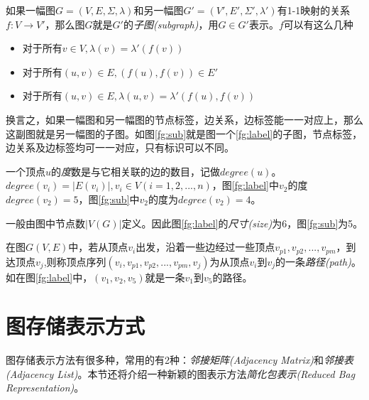 \documentclass{XDBAthesis}
\begin{document}
\begin{minipage}{\textwidth}
    \begin{minipage}{0.4\textwidth}
        \centering
        
        \label{fg:label}
    \end{minipage}%
    \begin{minipage}{0.6\textwidth}
        \centering
        
        \label{fg:sub}
    \end{minipage}\hfill
\end{minipage}
\begin{defn}[子图]
    如果一幅图$G=(V,E,\Sigma,\lambda)$和另一幅图$G'=(V',E',\Sigma',\lambda')$有1-1映射的关系$f:V\rightarrow V'$，那么图$G$就是$G'$的\emph{子图(subgraph)}，用$G\in G' $表示。$f$可以有这么几种
\begin{itemize}
    \item 对于所有$v\in V,\lambda(v)=\lambda '(f(v))$
    \item 对于所有$(u,v)\in E,(f(u),f(v))\in E'$
    \item 对于所有$(u,v)\in E,\lambda(u,v)=\lambda '(f(u),f(v)) $
\end{itemize}
\end{defn}
换言之，如果一幅图和另一幅图的节点标签，边关系，边标签能一一对应上，那么这副图就是另一幅图的子图。如图\ref{fg:sub}就是图一个\ref{fg:label}的子图，节点标签，边关系及边标签均可一一对应，只有标识可以不同。
\begin{defn}
    一个顶点$u$的\emph{度}数是与它相关联的边的数目，记做$degree(u)$。$degree(v_i )=|E(v_i )|,v_i \in V(i=1,2,...,n)$，图\ref{fg:label}中$v_2 $的度$degree(v_2 )=5$，图\ref{fg:sub}中$v_2 $的度为$degree(v_2)=4$。
\end{defn}
\begin{defn}
    一般由图中节点数$|V(G)|$定义。因此图\ref{fg:label}的\emph{尺寸(size)}为6，图\ref{fg:sub}为5。
\end{defn}
\begin{defn}[路径]
在图$G(V,E)$中，若从顶点$v_i$出发，沿着一些边经过一些顶点$v_{p1},v_{p2},...,v_{pm}$，到达顶点$v_j $,则称顶点序列$(v_{i},v_{p1},v_{p2},...,v_{pm},v_{j})$为从顶点$v_i $到$v_j $的一条\emph{路径(path)}。如在图\ref{fg:label}中，$(v_{1},v_{2},v_{5})$就是一条$v_1 $到$v_5 $的路径。  
\end{defn}
\section{图存储表示方式}
图存储表示方法有很多种，常用的有2种：\emph{邻接矩阵(Adjacency Matrix)}和\emph{邻接表(Adjacency List)}。本节还将介绍一种新颖的图表示方法\emph{简化包表示(Reduced Bag Representation)}\cite{ghash}。
\end{document}
